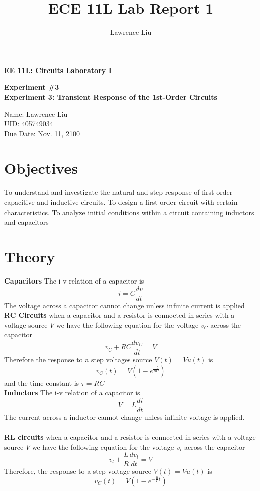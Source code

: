 \documentclass[12pt]{article}
\title{ECE 11L Lab Report 1}
\author{Lawrence Liu}
\begin{document}
\begin{titlepage}
   \begin{center}
       \vspace*{1cm}

       \textbf{EE 11L: Circuits Laboratory I}

       \vspace{2cm}

       \textbf{Experiment \#3}\\
       \textbf{Experiment 3: Transient Response of the 1st-Order
Circuits}

            
       \vspace{4cm}
     
            
       Name: Lawrence Liu\\
		UID: 405749034\\
		Due Date: Nov. 11, 2100
            
   \end{center}
\end{titlepage}
\section*{Objectives}
To understand and investigate the natural and step response of first order capacitive and inductive circuits. To design a first-order circuit with certain characteristics. To analyze initial conditions within a circuit containing inductors and capacitors 
\section*{Theory}
\textbf{Capacitors}
The i-v relation of a capacitor is
$$i=C\frac{dv}{dt}$$
The voltage across a capacitor cannot change unless infinite current is applied
\\
\textbf{RC Circuits}
when a capacitor and a resistor is connected in series with a voltage source $V$ we have the following equation for the voltage $v_C$ across the capacitor
$$v_C+RC\frac{dv_C}{dt}=V$$
Therefore the response to a step voltages source $V(t)=Vu(t)$ is
$$v_C(t)=V(1-e^{\frac{-t}{RC}})$$
and the time constant is $\tau=RC$ 
\\
\textbf{Inductors} The i-v relation of a capacitor is 
$$V=L\frac{di}{dt}$$
The current across a inductor cannot change unless infinite voltage is applied. 
\\\\
\textbf{RL circuits} 
when a capacitor and a resistor is connected in series with a voltage source $V$ we have the following equation for the voltage $v_l$ across the capacitor
$$v_l+\frac{L}{R}\frac{dv_l}{dt}=V$$
Therefore, the response to a step voltage source $V(t)=Vu(t)$ is
$$v_C(t)=V(1-e^{-\frac{R}{L}t})$$
\pagebreak
\end{document}
